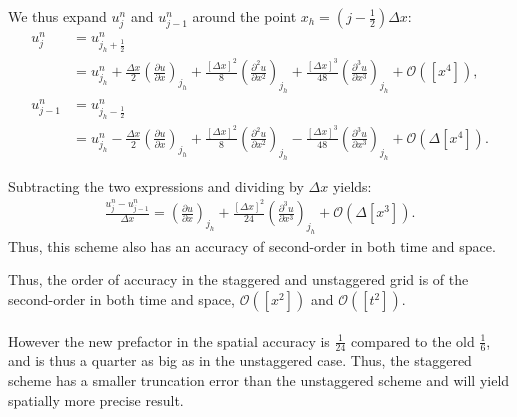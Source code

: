 We thus expand $u_j^n$ and $u_{j-1}^n$ 
around the point $x_h = \left(j - \tfrac{1}{2}\right)\Delta x$:
\begin{align}
u_j^n &= u_{j_h+\tfrac{1}{2}}^n \\
&= u_{j_h}^n + \frac{\Delta x}{2} \left(\frac{\partial u}{\partial x}\right)_{j_h}
+ \frac{\left[\Delta x\right]^2}{8} \left(\frac{\partial^2 u}{\partial x^2}\right)_{j_h}
+ \frac{\left[\Delta x\right]^3}{48} \left(\frac{\partial^3 u}{\partial x^3}\right)_{j_h}
+ \mathcal{O}(\left[x^4\right]),
\\
u_{j-1}^n &= u_{j_h-\tfrac{1}{2}}^n \\
&= u_{j_h}^n - \frac{\Delta x}{2} \left(\frac{\partial u}{\partial x}\right)_{j_h}
+ \frac{\left[\Delta x\right]^2}{8} \left(\frac{\partial^2 u}{\partial x^2}\right)_{j_h}
- \frac{\left[\Delta x\right]^3}{48} \left(\frac{\partial^3 u}{\partial x^3}\right)_{j_h}
+ \mathcal{O}(\Delta \left[x^4\right]).
\end{align}

Subtracting the two expressions and dividing by $\Delta x$ yields:
\begin{align}
\frac{u_j^n - u_{j-1}^n}{\Delta x}
= \left(\frac{\partial u}{\partial x}\right)_{j_h}
+ \frac{\left[\Delta x\right]^2}{24}\left(\frac{\partial^3u}{\partial x^3}\right)_{j_h}+\mathcal{O}(\Delta \left[x^3\right]).
\end{align}
Thus, this scheme also has an accuracy of second-order in both time and space.

\begin{answer}
    Thus, the order of accuracy in the staggered and unstaggered grid is of the second-order in both time and space, $\mathcal{O}(\left[x^2\right])$ and $\mathcal{O}(\left[t^2\right])$. 
    \\ \text{ } \\
    However the new prefactor in the spatial accuracy is $\tfrac{1}{24}$ compared to the old $\tfrac{1}{6}$, and is thus a quarter as big as in the unstaggered case. Thus, the staggered scheme has a smaller truncation error than the unstaggered scheme and will yield spatially more precise result. 
\end{answer}
